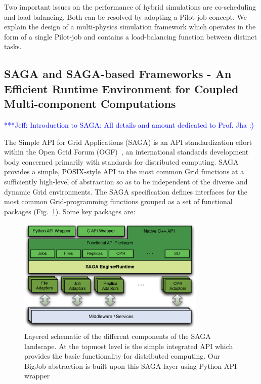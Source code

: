 \documentclass[preprint,12pt]{elsarticle}
\newcommand{\skonote}[1]{ {\textcolor{blue} { ***Jeff: #1 }}}
\newcommand{\skonote}[1]{}
\begin{document}
Two important issues on the performance of hybrid simulations are co-scheduling and load-balancing. Both can be resolved by adopting a Pilot-job concept. We explain the design of a multi-physics simulation framework which operates in the form of a single Pilot-job and contains a load-balancing function between distinct tasks.

\subsection{SAGA and SAGA-based Frameworks - An Efficient Runtime Environment for Coupled Multi-component Computations}

\skonote{Introduction to SAGA: All details and amount dedicated to Prof. Jha :) }

The Simple API for Grid Applications (SAGA) is an API standardization effort within the Open Grid Forum (OGF)~\cite{ogf_web}, an international standards development body concerned primarily with standards for distributed computing. SAGA provides a simple, POSIX-style API to the most common Grid functions at a sufficiently high-level of abstraction so as to be independent of the diverse and dynamic Grid environments. The SAGA specification defines interfaces for the most common Grid-programming functions grouped as a set of functional packages (Fig.~\ref{Fig:SAGA1}). Some key packages are:

\begin{figure}
 \begin{center}
     \includegraphics[width=0.8\textwidth]{stci_saga_figures-1.eps}
 \end{center}
\caption{\small Layered schematic of the different components of the SAGA landscape. At the topmost level is the simple integrated API which provides the basic functionality for distributed computing. Our BigJob abstraction is built upon this SAGA layer using Python API wrapper}
 \label{Fig:SAGA1}
 \vspace{-1em}
\end{figure}
\end{document}

